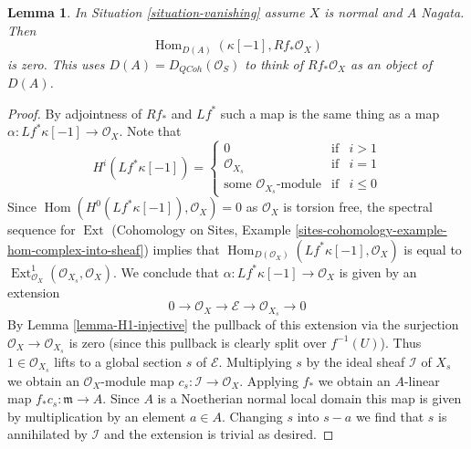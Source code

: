 \documentclass{stacks-project}
\theoremstyle{plain}
\newtheorem{lemma}[subsection]{Lemma}
\theoremstyle{definition}
\theoremstyle{remark}
\numberwithin{equation}{subsection}
\def\Hom{\mathop{\mathrm{Hom}}\nolimits}
\def\Ext{\mathop{\mathrm{Ext}}\nolimits}
\def\QCoh{\mathit{QCoh}}
\begin{document}
\begin{lemma}
\label{lemma-R1-injective}
In Situation \ref{situation-vanishing} assume $X$ is normal and $A$ Nagata.
Then
$$
\Hom_{D(A)}(\kappa[-1], Rf_*\mathcal{O}_X)
$$
is zero. This uses $D(A) = D_\QCoh(\mathcal{O}_S)$ to think of
$Rf_*\mathcal{O}_X$ as an object of $D(A)$.
\end{lemma}

\begin{proof}
By adjointness of $Rf_*$ and $Lf^*$ such a map is the same thing
as a map $\alpha : Lf^*\kappa[-1] \to \mathcal{O}_X$. Note that
$$
H^i(Lf^*\kappa[-1]) =
\left\{
\begin{matrix}
0 & \text{if} & i > 1 \\
\mathcal{O}_{X_s} & \text{if} & i = 1 \\
\text{some }\mathcal{O}_{X_s}\text{-module} & \text{if} & i \leq 0
\end{matrix}
\right.
$$
Since $\Hom(H^0(Lf^*\kappa[-1]), \mathcal{O}_X) = 0$ as $\mathcal{O}_X$
is torsion free, the spectral sequence for $\Ext$
(Cohomology on Sites, Example
\ref{sites-cohomology-example-hom-complex-into-sheaf})
implies that
$\Hom_{D(\mathcal{O}_X)}(Lf^*\kappa[-1], \mathcal{O}_X)$ is equal to
$\Ext^1_{\mathcal{O}_X}(\mathcal{O}_{X_s}, \mathcal{O}_X)$.
We conclude that
$\alpha : Lf^*\kappa[-1] \to \mathcal{O}_X$ is given by an extension
$$
0 \to \mathcal{O}_X \to \mathcal{E} \to \mathcal{O}_{X_s} \to 0
$$
By Lemma \ref{lemma-H1-injective} the pullback of this extension
via the surjection $\mathcal{O}_X \to \mathcal{O}_{X_s}$ is zero
(since this pullback is clearly split over $f^{-1}(U)$).
Thus $1 \in \mathcal{O}_{X_s}$ lifts to a global section $s$ of
$\mathcal{E}$. Multiplying $s$ by the ideal sheaf $\mathcal{I}$
of $X_s$ we obtain an $\mathcal{O}_X$-module map
$c_s : \mathcal{I} \to \mathcal{O}_X$. Applying $f_*$ we obtain
an $A$-linear map $f_*c_s : \mathfrak m \to A$. Since $A$ is
a Noetherian normal local domain this map is given by multiplication
by an element $a \in A$. Changing $s$ into $s -  a$ we find that
$s$ is annihilated by $\mathcal{I}$ and the extension is trivial
as desired.
\end{proof}
\end{document}
